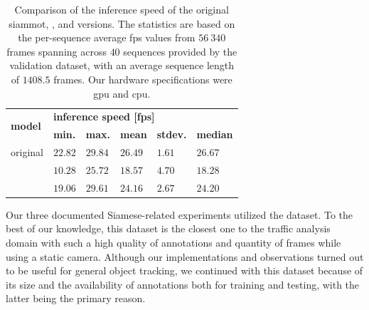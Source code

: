 \begin{table}[!t]
    \centering
    \begin{tabular}{llllll}
        \toprule
        \multirow{2}{*}{\textbf{model}} & \multicolumn{5}{l}{\textbf{inference speed [\gls{fps}]}}                                                                     \\
                                        & \textbf{min.}                                            & \textbf{max.} & \textbf{mean} & \textbf{stdev.} & \textbf{median} \\
        \midrule
        original                        & $22.82$                                                  & $29.84$       & $26.49$       & $1.61$          & $26.67$         \\
        \fembmodel{}                    & $10.28$                                                  & $25.72$       & $18.57$       & $4.70$          & $18.28$         \\
        \dsamodel{}                     & $19.06$                                                  & $29.61$       & $24.16$       & $2.67$          & $24.20$         \\
        \bottomrule
    \end{tabular}
    \caption[\gls{dsa} extension inference time comparison]{Comparison of the inference speed of the original \gls{siammot}, \fembmodel{}, and \dsamodel{} versions. The statistics are based on the per-sequence average \gls{fps} values from $56\ 340$ frames spanning across $40$ sequences provided by the \uadetrac{} validation dataset, with an average sequence length of $1408.5$ frames. Our hardware specifications were \usedgpu{} \gls{gpu} and \usedcpu{} \gls{cpu}.}
    \label{tab:InferenceSpeedComparison}
\end{table}

Our three documented Siamese-related experiments utilized the \uadetrac{} dataset. To the best of our knowledge, this dataset is the closest one to the traffic analysis domain with such a high quality of annotations and quantity of frames while using a static camera. Although our implementations and observations turned out to be useful for general object tracking, we continued with this dataset because of its size and the availability of annotations both for training and testing, with the latter being the primary reason.

